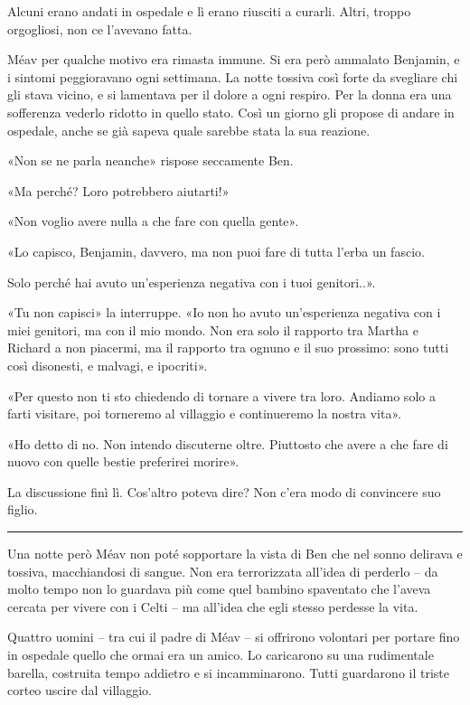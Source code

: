 \documentclass[a4paper,11pt,oneside,openright,final]{memoir}
\begin{document}
Alcuni erano andati in ospedale e lì erano riusciti a curarli. Altri, troppo
orgogliosi, non ce l'avevano fatta.

Méav per qualche motivo era rimasta immune. Si era però ammalato Benjamin, e i
sintomi peggioravano ogni settimana. La notte tossiva così forte da svegliare
chi gli stava vicino, e si lamentava per il dolore a ogni respiro. Per la donna
era una sofferenza vederlo ridotto in quello stato. Così un giorno gli propose
di andare in ospedale, anche se già sapeva quale sarebbe stata la sua reazione.

«Non se ne parla neanche» rispose seccamente Ben.

«Ma perché? Loro potrebbero aiutarti!»

«Non voglio avere nulla a che fare con quella gente».

«Lo capisco, Benjamin, davvero, ma non puoi fare di tutta l'erba un fascio.

Solo perché hai avuto un'esperienza negativa con i tuoi genitori..».

«Tu non capisci» la interruppe. «Io non ho avuto un'esperienza negativa con i
miei genitori, ma con il mio mondo. Non era solo il rapporto tra Martha e
Richard a non piacermi, ma il rapporto tra ognuno e il suo prossimo: sono tutti
così disonesti, e malvagi, e ipocriti».

«Per questo non ti sto chiedendo di tornare a vivere tra loro. Andiamo solo a
farti visitare, poi torneremo al villaggio e continueremo la nostra vita».

«Ho detto di no. Non intendo discuterne oltre. Piuttosto che avere a che fare
di nuovo con quelle bestie preferirei morire».

La discussione finì lì. Cos'altro poteva dire? Non c'era modo di convincere
suo figlio.

\plainbreak{1}

Una notte però Méav non poté sopportare la vista di Ben che nel sonno
delirava e tossiva, macchiandosi di sangue. Non era terrorizzata all'idea di
perderlo -- da molto tempo non lo guardava più come quel bambino spaventato
che l'aveva cercata per vivere con i Celti -- ma all'idea che egli stesso
perdesse la vita.

Quattro uomini -- tra cui il padre di Méav -- si offrirono volontari per
portare fino in ospedale quello che ormai era un amico. Lo caricarono su una
rudimentale barella, costruita tempo addietro e si incamminarono. Tutti
guardarono il triste corteo uscire dal villaggio.
\end{document}
